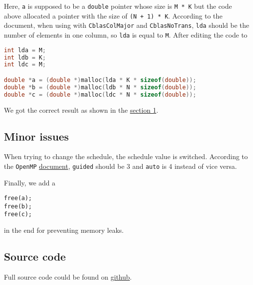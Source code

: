 \documentclass[
  12pt,
  xcolor = usenames,dvipsnames]{article}
\newcommand{\passthrough}[1]{#1}
\begin{document}
Here, \passthrough{\lstinline!a!} is supposed to be a \passthrough{\lstinline!double!} pointer whose size is \passthrough{\lstinline!M * K!} but the code above allocated a pointer with the size of \passthrough{\lstinline!(N + 1) * K!}. According to the document, when using with \passthrough{\lstinline!CblasColMajor!} and \passthrough{\lstinline!CblasNoTrans!}, \passthrough{\lstinline!lda!} should be the number of elements in one column, so \passthrough{\lstinline!lda!} is equal to \passthrough{\lstinline!M!}. After editing the code to

\begin{lstlisting}[language=C]
int lda = M;
int ldb = K;
int ldc = M;

double *a = (double *)malloc(lda * K * sizeof(double));
double *b = (double *)malloc(ldb * N * sizeof(double));
double *c = (double *)malloc(ldc * N * sizeof(double));
\end{lstlisting}

We got the correct result as shown in the \protect\hyperlink{techniques}{section 1}.

\hypertarget{minor-issues}{%
\subsection*{Minor issues}\label{minor-issues}}

When trying to change the schedule, the schedule value is switched. According to the \passthrough{\lstinline!OpenMP!} \href{https://www.openmp.org/spec-html/5.0/openmpsu121.html\#x158-7050003.2.12}{document}, \passthrough{\lstinline!guided!} should be 3 and \passthrough{\lstinline!auto!} is 4 instead of vice versa.

Finally, we add a

\begin{lstlisting}
free(a);
free(b);
free(c);
\end{lstlisting}

in the end for preventing memory leaks.

\hypertarget{source-code}{%
\subsection*{Source code}\label{source-code}}

Full source code could be found on \href{https://github.com/vnghia/4MIC-HPC}{github}.
\end{document}
